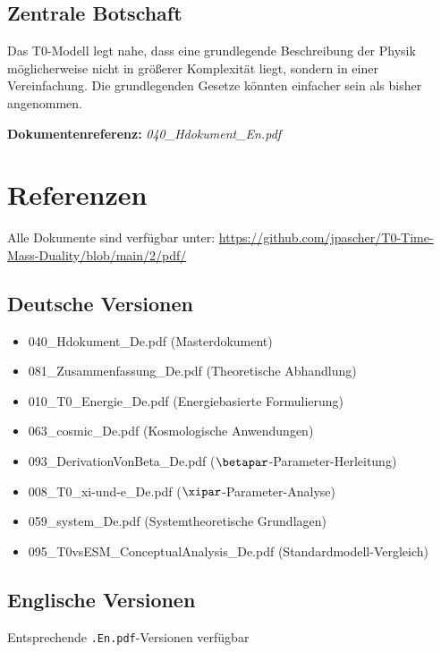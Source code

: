 \subsection{Zentrale Botschaft}

Das T0-Modell legt nahe, dass eine grundlegende Beschreibung der Physik möglicherweise nicht in größerer Komplexität liegt, sondern in einer Vereinfachung. Die grundlegenden Gesetze könnten einfacher sein als bisher angenommen.

\textbf{Dokumentenreferenz:} \textit{040\_Hdokument\_En.pdf}

\section{Referenzen}

Alle Dokumente sind verfügbar unter: \url{https://github.com/jpascher/T0-Time-Mass-Duality/blob/main/2/pdf/}

\subsection{Deutsche Versionen}

\begin{itemize}
	\item 040\_Hdokument\_De.pdf (Masterdokument)
	\item 081\_Zusammenfassung\_De.pdf (Theoretische Abhandlung)
	\item 010\_T0\_Energie\_De.pdf (Energiebasierte Formulierung)
	\item 063\_cosmic\_De.pdf (Kosmologische Anwendungen)
	\item 093\_DerivationVonBeta\_De.pdf ($\betapar$-Parameter-Herleitung)
	\item 008\_T0\_xi-und-e\_De.pdf ($\xipar$-Parameter-Analyse)
	\item 059\_system\_De.pdf (Systemtheoretische Grundlagen)
	\item 095\_T0vsESM\_ConceptualAnalysis\_De.pdf (Standardmodell-Vergleich)
\end{itemize}

\subsection{Englische Versionen}

Entsprechende \texttt{.En.pdf}-Versionen verfügbar